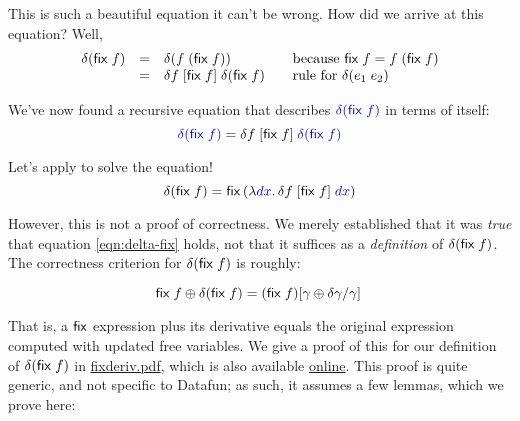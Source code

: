 \documentclass{article}
\begin{document}
This is such a beautiful equation it can't be wrong. How did we arrive at this
equation? Well,
\[
\begin{array}{rcl>{\hspace{1em}}l}
  \delta(\ms{fix}\; f)
  &=& \delta(f \;(\ms{fix}\;f))
  & \text{because}~\ms{fix}\; f = f\;(\ms{fix}\;f)\\
  &=& \delta f \;\disc{\ms{fix}\; f} \; \delta(\ms{fix}\; f)
  & \text{rule for}~\delta(e_1\;e_2)
\end{array}
\]

We've now found a recursive equation that describes
${\color{blue}\delta(\mathsf{fix}\;f)}$ in terms of itself:
\begin{equation}\label{eqn:delta-fix}
  {\color{blue} \delta(\ensuremath{\mathsf{fix}}\;f)}
  = \delta f \;[{\mathsf{fix}\; f}] \; {\color{blue}\delta(\mathsf{fix}\;f)}
\end{equation}

Let's apply  to solve the equation!
\begin{equation*}
  \delta(\mathsf{fix}\; f)
  =
  \mathsf{fix}\,(\lambda{\color{blue}dx}.\,
  \delta f \;[{\mathsf{fix}\;f}] \;{\color{blue}dx})
\end{equation*}

However, this is not a proof of correctness. We merely established that it
was \emph{true} that equation \ref{eqn:delta-fix} holds, not that it suffices as
a \emph{definition} of $\delta(\mathsf{fix}\;f)$. The correctness criterion for
$\delta(\mathsf{fix}\; f)$ is roughly:

\begin{equation}
  \mathsf{fix}\;f \oplus \delta(\mathsf{fix}\;f)
  = (\mathsf{fix}\;f)[{\gamma \oplus \delta\gamma/\gamma}]\,
\end{equation}

That is, a $\mathsf{fix}$ expression plus its derivative equals the original
expression computed with updated free variables. We give a proof of this for our
definition of $\delta(\mathsf{fix}\;f)$ in \url{fixderiv.pdf}, which is also
available \href{http://www.rntz.net/files/fixderiv.pdf}{online}. This proof is
quite generic, and not specific to Datafun; as such, it assumes a few lemmas,
which we prove here:

\par {}

\end{document}
